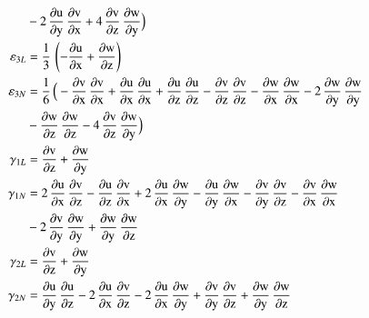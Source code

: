 \begin{subequations}
\begin{align}
	\mbox{} & - 2 \, \mathrm{\frac{\partial u}{\partial y}}\, \mathrm{\frac{\partial v}{\partial x}} + 4 \, \mathrm{\frac{\partial v}{\partial z}}\, \mathrm{\frac{\partial w}{\partial y}}\Big)\\
	\mathrm \varepsilon_{3L} & = \frac{1}{3} \, \left(-\mathrm{\frac{\partial u}{\partial x}} + \mathrm{\frac{\partial w}{\partial z}}\right)\\
	\mathrm \varepsilon_{3N} & = \frac{1}{6} \, \Big(- \mathrm{\frac{\partial v}{\partial x}}\, \mathrm{\frac{\partial v}{\partial x}} + \mathrm{\frac{ \partial u}{\partial x}}\, \mathrm{\frac{ \partial u}{\partial x}} + \mathrm{\frac{\partial u}{\partial z}}\, \mathrm{\frac{\partial u}{\partial z}} - \mathrm{\frac{\partial v}{\partial z}}\, \mathrm{\frac{\partial v}{\partial z}} - \mathrm{\frac{\partial w}{\partial x}}\, \mathrm{\frac{\partial w}{\partial x}} - 2 \,  \mathrm{\frac{\partial w}{\partial y}}\, \mathrm{\frac{\partial w}{\partial y}} \notag \\
	\mbox{} & -  \mathrm{\frac{\partial w}{\partial z}}\, \mathrm{\frac{\partial w}{\partial z}} - 4 \, \mathrm{\frac{\partial v}{\partial z}}\, \mathrm{\frac{\partial w}{\partial y}}\Big)\\
	\mathrm \gamma_{1L} & = \mathrm{\frac{\partial v}{\partial z}} + \mathrm{\frac{\partial w}{\partial y}}\\
	\mathrm \gamma_{1N} & = 2 \, \mathrm{\frac{\partial u}{\partial x}}\, \mathrm{\frac{\partial v}{\partial z}} - \mathrm{\frac{ \partial u}{\partial z}}\, \mathrm{\frac{ \partial v}{\partial x}} + 2 \, \mathrm{\frac{\partial u}{\partial x}}\, \mathrm{\frac{\partial w}{\partial y}} - \mathrm{\frac{\partial u}{\partial y}}\, \mathrm{\frac{\partial w}{\partial x}} - \mathrm{\frac{\partial v}{\partial y}}\, \mathrm{\frac{\partial v}{\partial z}} -   \mathrm{\frac{\partial v}{\partial x}}\, \mathrm{\frac{\partial w}{\partial x}} \notag \\
	\mbox{} & - 2 \, \mathrm{\frac{\partial v}{\partial y}}\, \mathrm{\frac{\partial w}{\partial y}} + \mathrm{\frac{\partial w}{\partial y}}\, \mathrm{\frac{\partial w}{\partial z}}\\
	\mathrm \gamma_{2L} & = \mathrm{\frac{\partial v}{\partial z}} + \mathrm{\frac{\partial w}{\partial y}}\\
	\mathrm \gamma_{2N} & = \mathrm{\frac{\partial u}{\partial y}}\, \mathrm{\frac{\partial u}{\partial z}} - 2 \, \mathrm{\frac{ \partial u}{\partial x}}\, \mathrm{\frac{ \partial v}{\partial z}} - 2 \, \mathrm{\frac{\partial u}{\partial x}}\, \mathrm{\frac{\partial w}{\partial y}} + \mathrm{\frac{\partial v}{\partial y}}\, \mathrm{\frac{\partial v}{\partial z}} + \mathrm{\frac{\partial w}{\partial y}}\, \mathrm{\frac{\partial w}{\partial z}}\\

\end{align}
\end{subequations}
